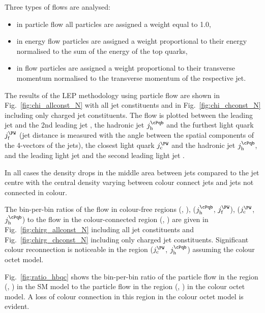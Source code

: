 \label{sec:LEP_methodology}

Three types of flows are analysed:
\begin{itemize}
\item in particle flow all particles are assigned a weight equal to 1.0,
\item in energy flow particles are assigned a weight proportional to their energy normalised to the sum of the energy of the top quarks,
\item in \pt flow particles are assigned a weight proportional to their transverse momentum normalised to the transverse momentum of the respective jet.
\end{itemize}

The results of the LEP methodology using particle flow are shown in Fig.~\ref{fig:chi_allconst_N} with all jet constituents and in Fig.~\ref{fig:chi_chconst_N} including only charged jet constituents. The flow is plotted between the leading \cPqb jet \leadingb and the 2nd leading \cPqb jet \scndleadingb, the hadronic \cPqb jet $j_{\text{h}}^{\cPqb}$ and the furthest light quark $j_{\text{f}}^{\PW}$ (jet distance is measured with the angle between the spatial components of the 4-vectors of the jets), the closest light quark $j_{\text{c}}^{\PW}$ and the hadronic \cPqb jet $j_{\text{h}}^{\cPqb}$, and the leading light jet \leadingjet and the second leading light jet \scndleadingjet.

In all cases the density drops in the middle area between jets compared to the jet centre with the central density varying between colour connect jets and jets not connected in colour.

The bin-per-bin ratios of the flow in colour-free regions (\leadingb, \scndleadingb), ($j_{\text{h}}^{\cPqb}$, $j_{\text{f}}^{\PW}$), ($j_{\text{c}}^{\PW}$, $j_{\text{h}}^{\cPqb}$) to the flow in the colour-connected region (\leadingjet, \scndleadingjet) are given in Fig.~\ref{fig:chirg_allconst_N} including all jet constituents and Fig.~\ref{fig:chirg_chconst_N} including only charged jet constituents. Significant colour reconnection is noticeable in the region ($j_{\text{c}}^{\PW}$, $j_{\text{h}}^{\cPqb}$) assuming the colour octet \PW model.

Fig.~\ref{fig:ratio_hbqc} shows the bin-per-bin ratio of the particle flow in the region (\leadingjet, \scndleadingjet) in the SM model to the particle flow in the region (\leadingjet, \scndleadingjet) in the colour octet \PW model. A loss of colour connection in this region in the colour octet \PW model is evident.

